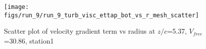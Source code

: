 \begin{figure}[H]
\centering
\texttt{[image: figs/run\_9/run\_9\_turb\_visc\_ettap\_bot\_vs\_r\_mesh\_scatter]}
\caption{Scatter plot of velocity gradient term vs radius at $z/c$=5.37, $V_{free}$=30.86, station1}
\label{fig:run_9_turb_visc_ettap_bot_vs_r_mesh_scatter}
\end{figure}


